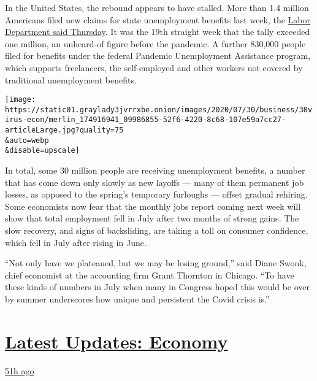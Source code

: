 In the United States, the rebound appears to have stalled. More than 1.4
million Americans filed new claims for state unemployment benefits last
week, the \href{https://oui.doleta.gov/press/2020/073020.pdf}{Labor
Department said Thursday}. It was the 19th straight week that the tally
exceeded one million, an unheard-of figure before the pandemic. A
further 830,000 people filed for benefits under the federal Pandemic
Unemployment Assistance program, which supports freelancers, the
self-employed and other workers not covered by traditional unemployment
benefits.

\texttt{[image: https://static01.graylady3jvrrxbe.onion/images/2020/07/30/business/30virus-econ/merlin\_174916941\_09986855-52f6-4220-8c68-107e59a7cc27-articleLarge.jpg?quality=75\\\&auto=webp\\\&disable=upscale]}

In total, some 30 million people are receiving unemployment benefits, a
number that has come down only slowly as new layoffs --- many of them
permanent job losses, as opposed to the spring's temporary furloughs ---
offset gradual rehiring. Some economists now fear that the monthly jobs
report coming next week will show that total employment fell in July
after two months of strong gains. The slow recovery, and signs of
backsliding, are taking a toll on consumer confidence, which fell in
July after rising in June.

``Not only have we plateaued, but we may be losing ground,'' said Diane
Swonk, chief economist at the accounting firm Grant Thornton in Chicago.
``To have these kinds of numbers in July when many in Congress hoped
this would be over by summer underscores how unique and persistent the
Covid crisis is.''

\hypertarget{latest-updates-economy}{%
\section{\texorpdfstring{\href{https://www.nytimes3xbfgragh.onion/live/2020/07/31/business/stock-market-today-coronavirus?action=click\&pgtype=Article\&state=default\&region=MAIN_CONTENT_1\&context=storylines_live_updates}{Latest
Updates:
Economy}}{Latest Updates: Economy}}\label{latest-updates-economy}}

\href{https://www.nytimes3xbfgragh.onion/live/2020/07/31/business/stock-market-today-coronavirus?action=click\&pgtype=Article\&state=default\&region=MAIN_CONTENT_1\&context=storylines_live_updates\#kodaks-chief-executive-was-given-stock-options-then-the-share-price-spiked-1000-percent}{51h
ago}

